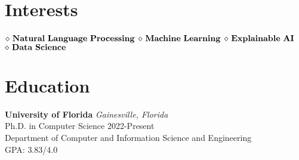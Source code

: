 \documentclass[a4paper,11pt]{article}
\begin{document}

\pagestyle{empty} %



\section{Interests}
$\diamond {\bf \ Natural \ Language \ Processing}$
$\diamond {\bf \ Machine \ Learning}$
$\diamond {\bf \ Explainable\ AI}$  
$\diamond {\bf \ Data \ Science}$ 




\section{Education}
{{\bf University of Florida} \hfill {\em Gainesville, Florida} 
\\{\normalsize Ph.D. in Computer Science} \hfill
 2022-Present
 \\ \small Department of Computer and Information Science and Engineering \hfill $\;$
 \\{\normalsize GPA: 3.83/4.0} \hfill }
 
\end{document}
